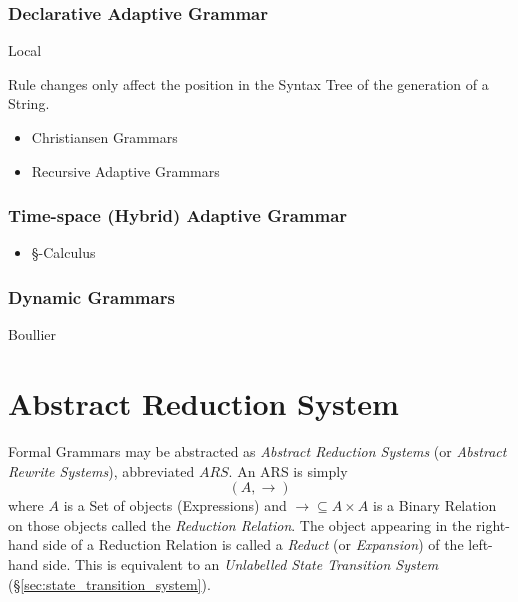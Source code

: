 \subsubsection{Declarative Adaptive Grammar}

Local

Rule changes only affect the position in the Syntax Tree of the
generation of a String.

\begin{itemize}
\item Christiansen Grammars
\item Recursive Adaptive Grammars
\end{itemize}



\subsubsection{Time-space (Hybrid) Adaptive Grammar}

\begin{itemize}
\item \S-Calculus
\end{itemize}



\subsubsection{Dynamic Grammars}

Boullier\cite{boullier94}



\section{Abstract Reduction System}\label{sec:abstract_rewrite}

Formal Grammars may be abstracted as \emph{Abstract Reduction Systems}
(or \emph{Abstract Rewrite Systems}), abbreviated $ARS$. An ARS is
simply
    \[(A,\rightarrow)\]
where $A$ is a Set of objects (Expressions) and $\rightarrow \subseteq
A \times A$ is a Binary Relation on those objects called the
\emph{Reduction Relation}. The object appearing in the right-hand side
of a Reduction Relation is called a \emph{Reduct} (or
\emph{Expansion}) of the left-hand side. This is equivalent to an
\emph{Unlabelled State Transition System}
(\S\ref{sec:state_transition_system}).

